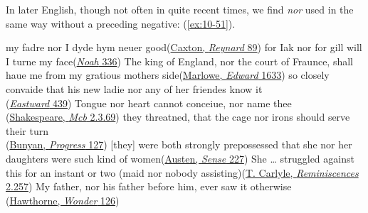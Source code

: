In later English, though not often in quite recent times, we find \textit{nor} used in the same way without a preceding negative: (\ref{ex:10-51}).

\ea \label{ex:10-51}
\ea
my fadre nor I dyde hym neuer good\hfill(\href{https://archive.org/details/TheHistoryOfReynardTheFoxArber/page/n117/mode/2up?q=%22dyde+hym+neuer+good%22&view=theater}{Caxton, \textit{Reynard} 89}) %
\ex
for Iak nor for gill will I turne my face\hfill(\href{https://archive.org/details/towneleyplays71engl/page/32/mode/2up?q=%22turne+my+face%22&view=theater}{\textit{Noah} 336}) %
\ex
The king of England, nor the court of Fraunce, shall haue me from my gratious mothers side\hfill(\href{https://quod.lib.umich.edu/e/eebo/A07018.0001.001/1:2?rgn=div1;view=fulltext}{Marlowe, \textit{Edward} 1633})
\ex
so closely convaide that his new ladie nor any of her friendes know it\\\hfill(\href{https://archive.org/details/representativee02unkngoog/page/438/mode/2up?q=%22closely+convaide%22&view=theater}{\textit{Eastward} 439})
\ex
Tongue nor heart cannot conceiue, nor name thee\\\hfill(\href{https://internetshakespeare.uvic.ca/doc/Mac_F1/scene/2.3/index.html#tln-815}{Shakespeare, \textit{Mcb} 2.3.69})
\ex
they threatned, that the cage nor irons should serve their turn\\\hfill(\href{https://archive.org/details/bunyanspilgrims00moffgoog/page/122/mode/2up?q=%22cage+nor+irons%22&view=theater}{Bunyan, \textit{Progress} 127}) 
\ex
{}[they] were both strongly prepossessed that she nor her daughters were such kind of women\hfill(\href{https://archive.org/details/sensesensibility00austrich/page/200/mode/2up?q=%22both+strongly+prepossessed%22&view=theater}{Austen, \textit{Sense} 227}) %
\ex
She {\dots} struggled against this for an instant or two (maid nor nobody assisting)\hfill(\href{https://archive.org/details/reminiscences0000thom_e9a0/page/472/mode/2up?q=%22struggled+against+this%22&view=theater}{T. Carlyle, \textit{Reminiscences} 2.257}) %
\ex
My father, nor his father before him, ever saw it otherwise\\\hfill(\href{https://archive.org/details/AWonderBookForGirlsBoys/page/n201/mode/2up?q=%22nor+his+father+before+him%22&view=theater}{Hawthorne, \textit{Wonder} 126})
\z 
\z %

